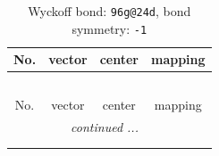 \documentclass[fleqn,8pt]{jsarticle}
\begin{document}
\renewcommand{\arraystretch}{1.2}
\begin{longtable}{cccc}
\caption{Wyckoff bond: {\tt 96g@24d}, bond symmetry: {\tt -1}}
 \\
 \hline \hline
No. & vector & center & mapping \\ \hline \endfirsthead

\multicolumn{3}{l}{\tablename\ \thetable{}} \\
 \hline \hline
No. & vector & center & mapping \\ \hline \endhead

 \hline \hline
\multicolumn{3}{r}{\footnotesize\it continued ...} \\ \endfoot

 \hline \hline
\multicolumn{3}{r}{} \\ \endlastfoot


\end{longtable}
\end{document}
